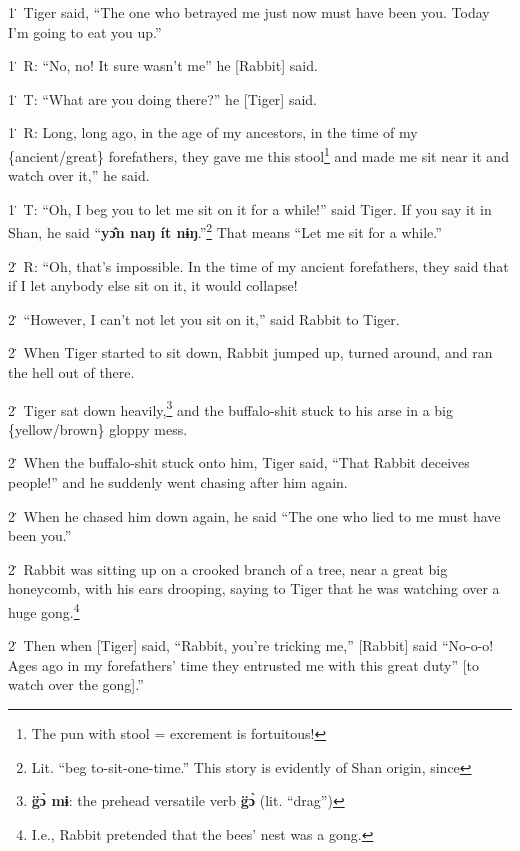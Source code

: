 1\. Tiger said, ``The one who betrayed me just now must have been you. Today I'm
going to eat you up.''

1\. R: ``No, no! It sure wasn't me'' he [Rabbit] said.

1\. T: ``What are you doing there?'' he [Tiger] said.

1\. R: Long, long ago, in the age of my ancestors, in the time of my \{ancient/great\}
forefathers, they gave me this stool\footnote{The pun with stool = excrement is fortuitous!} and made me sit near it and watch over
it,'' he said.

1\. T: ``Oh, I beg you to let me sit on it for a while!'' said Tiger. If you say
it in Shan, he said ``\textbf{yɔ̂n naŋ ít nɨŋ}.''\footnote{Lit. ``beg to-sit-one-time.'' This story is evidently of Shan origin, since} That means ``Let me
sit for a while.''

2\. R: ``Oh, that's impossible. In the time of my ancient forefathers, they said
that if I let anybody else sit on it, it would collapse!

2\. ``However, I can't not let you sit on it,'' said Rabbit to Tiger.

2\. When Tiger started to sit down, Rabbit jumped up, turned around, and ran the
hell out of there.

2\. Tiger sat down heavily,\footnote{\textbf{  g̈ɔ̀ mɨ}: the prehead versatile verb \textbf{g̈ɔ̀} (lit. ``drag'')} and the buffalo-shit stuck to his arse in a big
\{yellow/brown\} gloppy mess.

2\. When the buffalo-shit stuck onto him, Tiger said, ``That Rabbit deceives people!''
and he suddenly went chasing after him again.

2\. When he chased him down again, he said ``The one who lied to me must have been
you.''

2\. Rabbit was sitting up on a crooked branch of a tree, near a great big honeycomb,
with his ears drooping, saying to Tiger that he was watching over a huge gong.\footnote{I.e., Rabbit pretended that the bees' nest was a gong.}

2\. Then when [Tiger] said, ``Rabbit, you're tricking me,'' [Rabbit] said ``No-o-o!
Ages ago in my forefathers' time they entrusted me with this great duty'' [to watch
over the gong].''

